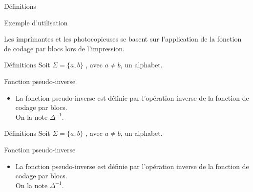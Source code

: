 \documentclass[12pt]{beamer}
\begin{document}
\begin{frame}[t]{Définitions}
  \begin{block}{Exemple d'utilisation}
   \item Les imprimantes et les photocopieuses se basent sur l'application de la fonction de codage par blocs lors de l'impression.
  \end{block}
\end{frame}
\begin{frame}[t]{Définitions}
 Soit $\Sigma = \{ a,b \}$ , avec $a \neq b$, un alphabet.
  \begin{block}{Fonction pseudo-inverse} 
    \begin{itemize}
    \item La fonction pseudo-inverse est définie par l'opération inverse de la fonction de codage par blocs.\\ On la note $\Delta^{-1}$.
\end{itemize}
\end{block}
\end{frame}
\begin{frame}[t]{Définitions}
 Soit $\Sigma = \{ a,b \}$ , avec $a \neq b$, un alphabet.
  \begin{block}{Fonction pseudo-inverse} 
    \begin{itemize}
    \item La fonction pseudo-inverse est définie par l'opération inverse de la fonction de codage par blocs.\\ On la note $\Delta^{-1}$.
\end{itemize}
\end{block}
\end{frame}
\end{document}
